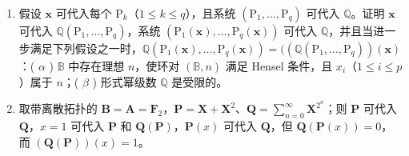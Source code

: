 \begin{enumerate}
\def\labelenumi{(\alph{enumi})}
\setcounter{enumi}{4}
\item
  假设 \(\mathbf{x}\) 可代入每个 \(\mathrm{P}_k\)（\(1 \leqslant k \leqslant q\)），且系统 \((\mathrm{P}_1, \ldots, \mathrm{P}_q)\) 可代入 \(\mathbb{Q}\)。证明 \(\mathbf{x}\) 可代入 \(\mathbb{Q}(\mathrm{P}_1, \ldots, \mathrm{P}_q)\)，系统 \((\mathrm{P}_1(\mathbf{x}), \ldots, \mathrm{P}_q(\mathbf{x}))\) 可代入 \(\mathbb{Q}\)，并且当进一步满足下列假设之一时，\(\mathbb{Q}(\mathrm{P}_1(\mathbf{x}), \ldots, \mathrm{P}_q(\mathbf{x})) = ((\mathbb{Q}(\mathrm{P}_1, \ldots, \mathrm{P}_q))(\mathbf{x})\)：( \(\alpha\) ) \(\mathbb{B}\) 中存在理想 \(n\)，使环对 \((\mathbb{B}, n)\) 满足 Hensel 条件，且 \(x_i\)（\(1 \leqslant i \leqslant p\)）属于 \(n\)；( \(\beta\) ) 形式幂级数 \(\mathbb{Q}\) 是受限的。
\item
  取带离散拓扑的 \(\mathbf{B} = \mathbf{A} = \mathbf{F}_2\)，\(\mathbf{P} = \mathbf{X} + \mathbf{X}^2\)、\(\mathbf{Q} = \sum_{n=0}^{\infty} \mathbf{X}^{2^n}\)；则 \(\mathbf{P}\) 可代入 \(\mathbf{Q}\)，\(x = 1\) 可代入 \(\mathbf{P}\) 和 \(\mathbf{Q}(\mathbf{P})\)，\(\mathbf{P}(x)\) 可代入 \(\mathbf{Q}\)，但 \(\mathbf{Q}(\mathbf{P}(x)) = 0\)，而 \((\mathbf{Q}(\mathbf{P}))(x) = 1\)。
\end{enumerate}
